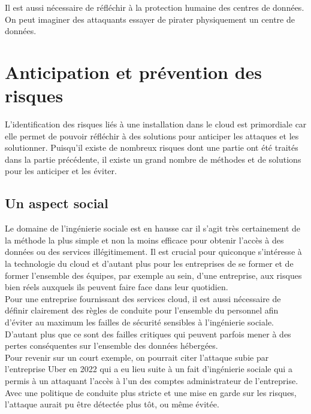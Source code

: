 \documentclass[a4paper, 12pt]{article}
\begin{document}
\begin{spacing}{1.1}
      Il est aussi nécessaire de réfléchir à la protection humaine des centres
      de données. On peut imaginer des attaquants essayer de pirater
      physiquement un centre de données.

  \section{Anticipation et prévention des risques}
      L'identification des risques liés à une installation dans le cloud est
      primordiale car elle permet de pouvoir réfléchir à des solutions pour
      anticiper les attaques et les solutionner. Puisqu'il existe de nombreux
      risques dont une partie ont été traités dans la partie précédente, il
      existe un grand nombre de méthodes et de solutions pour les anticiper
      et les éviter.

      \subsection{Un aspect social}
      Le domaine de l'ingénierie sociale est en hausse car il s'agit très
      certainement de la méthode la plus simple et non la moins efficace pour
      obtenir l'accès à des données ou des services illégitimement. Il est
      crucial pour quiconque s'intéresse à la technologie du cloud et d'autant
      plus pour les entreprises de se former et de former l'ensemble des
      équipes, par exemple au sein, d'une entreprise, aux risques bien réels
      auxquels ils peuvent faire face dans leur quotidien. \\

      Pour une entreprise fournissant des services cloud, il est aussi
      nécessaire de définir clairement des règles de conduite pour l'ensemble du
      personnel afin d'éviter au maximum les failles de sécurité sensibles à
      l'ingénierie sociale. D'autant plus que ce sont des failles critiques qui
      peuvent parfois mener à des pertes conséquentes sur l'ensemble des données
      hébergées. \\

      Pour revenir sur un court exemple, on pourrait citer l'attaque subie par
      l'entreprise Uber en 2022 qui a eu lieu suite à un fait d'ingénierie
      sociale qui a permis à un attaquant l'accès à l'un des comptes
      administrateur de l'entreprise. Avec une politique de conduite plus
      stricte et une mise en garde sur les risques, l'attaque aurait pu être
      détectée plus tôt, ou même évitée. \\


\end{spacing}
\end{document}
